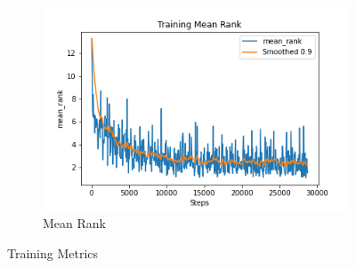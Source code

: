 \begin{figure}[H]
\begin{subfigure}[b]{0.3\textwidth}
         \includegraphics[width=\textwidth]{./figure/results/baseline_and_blindfolding/training/mean_rank.png}
         \caption{Mean Rank}
         \label{fig:training_mean_rank}
     \end{subfigure}
     \caption{Training Metrics}
     \label{fig:training_metrics}
\end{figure}

